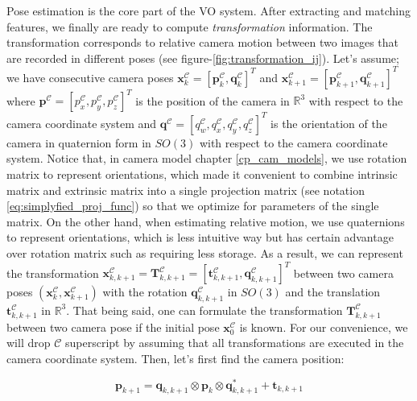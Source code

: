 \documentclass[a4paper]{report}
\numberwithin{figure}{section}
\newcommand{\R}{\mathbb{R}}
\begin{document}
Pose estimation is the core part of the VO system. After extracting and 
matching features, we finally are ready to compute \textit{transformation} 
information. The transformation corresponds to relative camera motion between 
two images that are recorded in different poses (see 
figure-\ref{fig:transformation_ij}). Let's assume; we have consecutive camera 
poses $\mathbf{x}_{k}^{\mathcal{C}} = [\mathbf{p}_k^{\mathcal{C}}, 
\mathbf{q}_k^{\mathcal{C}}]^T$ and 
$\mathbf{x}_{k+1}^{\mathcal{C}} = 
[\mathbf{p}_{k+1}^{\mathcal{C}}, \mathbf{q}_{k+1}^{\mathcal{C}}]^T$ where 
$\mathbf{p}^{\mathcal{C}} = [p_x^{\mathcal{C}}, 
p_y^{\mathcal{C}}, p_z^{\mathcal{C}}]^T$ 
is the position of the camera in $\R^3$ with respect to the camera coordinate 
system  and 
$\mathbf{q}^{\mathcal{C}} = [q_w^{\mathcal{C}}, q_x^{\mathcal{C}}, 
q_y^{\mathcal{C}}, 
q_z^{\mathcal{C}}]^T$ is the orientation of the camera in quaternion form in 
$SO(3)$ with respect to the camera coordinate system.  
Notice that, in camera model chapter \ref{cp_cam_models}, we use rotation 
matrix to represent orientations, which made it convenient to combine 
intrinsic matrix and extrinsic matrix into a single projection matrix (see 
notation \eqref{eq:simplyfied_proj_func}) so that we optimize for parameters 
of 
the single matrix. On the other hand, when estimating relative motion, we use 
quaternions to represent orientations, which is less intuitive way but has 
certain advantage over rotation matrix such as requiring less storage.  As a 
result, we can represent the transformation $\mathbf{x}_{k,k+1}^{\mathcal{C}} 
= 
\mathbf{T}_{k,k+1}^{\mathcal{C}}= 
[\mathbf{t}_{k,k+1}^{\mathcal{C}},\mathbf{q}_{k,k+1}^{\mathcal{C}}]^T$ between 
two camera poses 
$(\mathbf{x}_k^{\mathcal{C}},\mathbf{x}_{k+1}^{\mathcal{C}})$ with the 
rotation $\mathbf{q}_{k,k+1}^{\mathcal{C}}$ in 
$SO(3)$  and the translation $\mathbf{t}_{k,k+1}^{\mathcal{C}}$ in $\R^3$. 
That being said, 
one can formulate the transformation $\mathbf{T}_{k,k+1}^{\mathcal{C}}$ 
between two camera 
pose if the initial pose $\mathbf{x}_{0}^{\mathcal{C}}$ is known. 
For our convenience, we will drop $\mathcal{C}$ superscript by assuming that 
all transformations are executed in the camera coordinate system. 
Then, let's 
first find the 
camera position:

\begin{equation}\label{eq:translation_cam}
  \mathbf{p}_{k+1} = 
\mathbf{q}_{k,k+1} \otimes \mathbf{p}_k \otimes \mathbf{q}_{k,k+1}^* + 
  \mathbf{t}_{k,k+1}
\end{equation}
\end{document}
